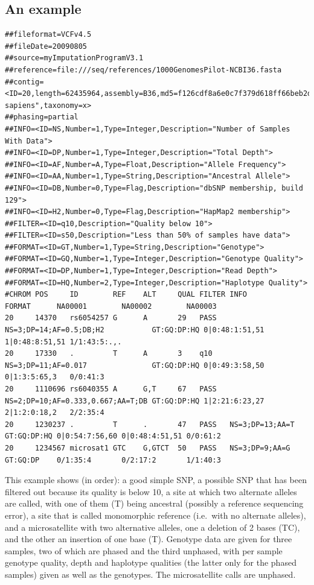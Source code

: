 \documentclass[8pt]{article}
\begin{document}
\subsection{An example}
\scriptsize
\begin{verbatim}
##fileformat=VCFv4.5
##fileDate=20090805
##source=myImputationProgramV3.1
##reference=file:///seq/references/1000GenomesPilot-NCBI36.fasta
##contig=<ID=20,length=62435964,assembly=B36,md5=f126cdf8a6e0c7f379d618ff66beb2da,species="Homo sapiens",taxonomy=x>
##phasing=partial
##INFO=<ID=NS,Number=1,Type=Integer,Description="Number of Samples With Data">
##INFO=<ID=DP,Number=1,Type=Integer,Description="Total Depth">
##INFO=<ID=AF,Number=A,Type=Float,Description="Allele Frequency">
##INFO=<ID=AA,Number=1,Type=String,Description="Ancestral Allele">
##INFO=<ID=DB,Number=0,Type=Flag,Description="dbSNP membership, build 129">
##INFO=<ID=H2,Number=0,Type=Flag,Description="HapMap2 membership">
##FILTER=<ID=q10,Description="Quality below 10">
##FILTER=<ID=s50,Description="Less than 50% of samples have data">
##FORMAT=<ID=GT,Number=1,Type=String,Description="Genotype">
##FORMAT=<ID=GQ,Number=1,Type=Integer,Description="Genotype Quality">
##FORMAT=<ID=DP,Number=1,Type=Integer,Description="Read Depth">
##FORMAT=<ID=HQ,Number=2,Type=Integer,Description="Haplotype Quality">
#CHROM POS     ID        REF    ALT     QUAL FILTER INFO                              FORMAT      NA00001        NA00002        NA00003
20     14370   rs6054257 G      A       29   PASS   NS=3;DP=14;AF=0.5;DB;H2           GT:GQ:DP:HQ 0|0:48:1:51,51 1|0:48:8:51,51 1/1:43:5:.,.
20     17330   .         T      A       3    q10    NS=3;DP=11;AF=0.017               GT:GQ:DP:HQ 0|0:49:3:58,50 0|1:3:5:65,3   0/0:41:3
20     1110696 rs6040355 A      G,T     67   PASS   NS=2;DP=10;AF=0.333,0.667;AA=T;DB GT:GQ:DP:HQ 1|2:21:6:23,27 2|1:2:0:18,2   2/2:35:4
20     1230237 .         T      .       47   PASS   NS=3;DP=13;AA=T                   GT:GQ:DP:HQ 0|0:54:7:56,60 0|0:48:4:51,51 0/0:61:2
20     1234567 microsat1 GTC    G,GTCT  50   PASS   NS=3;DP=9;AA=G                    GT:GQ:DP    0/1:35:4       0/2:17:2       1/1:40:3
\end{verbatim}
\normalsize
This example shows (in order): a good simple SNP, a possible SNP that has been filtered out because its quality is below 10, a site at which two alternate alleles are called, with one of them (T) being ancestral (possibly a reference sequencing error), a site that is called monomorphic reference (i.e.\ with no alternate alleles), and a microsatellite with two alternative alleles, one a deletion of 2 bases (TC), and the other an insertion of one base (T).
Genotype data are given for three samples, two of which are phased and the third unphased, with per sample genotype quality, depth and haplotype qualities (the latter only for the phased samples) given as well as the genotypes.
The microsatellite calls are unphased.
\end{document}
